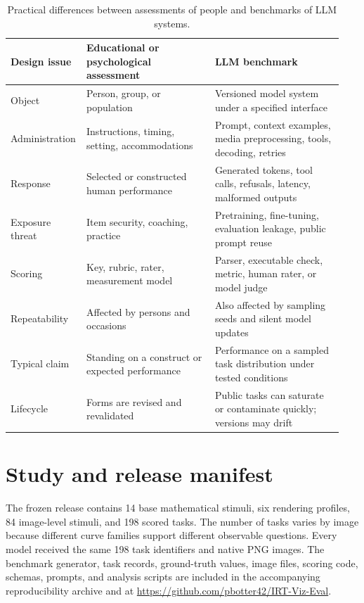 \documentclass[11pt]{article}
\begin{document}
\begin{table}[H]
\centering
\caption{Practical differences between assessments of people and benchmarks of LLM systems.}
\label{tab:supp-differences}
\begin{tabularx}{\linewidth}{p{0.18\linewidth}p{0.38\linewidth}p{0.38\linewidth}}
\toprule
Design issue & Educational or psychological assessment & LLM benchmark \\
\midrule
Object & Person, group, or population & Versioned model system under a specified interface \\
Administration & Instructions, timing, setting, accommodations & Prompt, context examples, media preprocessing, tools, decoding, retries \\
Response & Selected or constructed human performance & Generated tokens, tool calls, refusals, latency, malformed outputs \\
Exposure threat & Item security, coaching, practice & Pretraining, fine-tuning, evaluation leakage, public prompt reuse \\
Scoring & Key, rubric, rater, measurement model & Parser, executable check, metric, human rater, or model judge \\
Repeatability & Affected by persons and occasions & Also affected by sampling seeds and silent model updates \\
Typical claim & Standing on a construct or expected performance & Performance on a sampled task distribution under tested conditions \\
Lifecycle & Forms are revised and revalidated & Public tasks can saturate or contaminate quickly; versions may drift \\
\bottomrule
\end{tabularx}
\end{table}

\section{Study and release manifest}

The frozen release contains 14 base mathematical stimuli, six rendering profiles, 84 image-level stimuli, and 198 scored tasks. The number of tasks varies by image because different curve families support different observable questions. Every model received the same 198 task identifiers and native PNG images. The benchmark generator, task records, ground-truth values, image files, scoring code, schemas, prompts, and analysis scripts are included in the accompanying reproducibility archive and at \url{https://github.com/pbotter42/IRT-Viz-Eval}.
\end{document}

